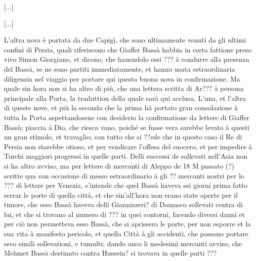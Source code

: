 \setcounter{docnumber}{15}



\setcounter{docnumber}{18}


[...]

\startcifrato

[...]

L'altra nova è  portata da due Capigì, che  sono ultimamente venuti da
gli  ultimi confini  di Persia,  quali riferiscono  che  Giaffer Bassà
habbia in  certa fattione preso  vivo Simon Giorgiano, et  dicono, che
hauendolo  essi ??? à  condurre alla  presenza del  Bassà, se  ne sono
partiti immediatamente,  et hanno usata  estraordinaria diligenzia nel
viaggio per portare  qui questa buona nova in  confirmazione. Ma quale
sin hora non  si ha altro di  più, che una lettera scritta  di Ar??? à
persona  principale alla  Porta, la  traduttion della  quale  sarà qui
acclusa. L'una,  et l'altra di queste  nove, et più la  seconda che la
prima hà portato gran consolazione à tutta la Porta aspettandosene con
desiderio la confirmatione da lettere di Giaffer Bassà; piaccia à Dio,
che riesca vano, poiché se fusse  vera sarebbe levato à questi un gran
stimolo, et travaglio; con tutto che si ??ede che in questo caso il Re
di Persia non starebbe otioso,  et per vendicare l'offesa del suocero,
et per  impedire à  Turchi maggiori progressi  in quelle  parti. Delli
successi de sollevati nell'Asia non si ha altro avviso, ma per lettere
di mercanti di Aleppo de 18 M passato (?) scritte qua con occasione di
messo estraordinario  à gli ?? mercanti  nostri per lo  ??? di lettere
per Venezia,  s'intende che quel  Bassà haveva sei giorni  prima fatto
serrar le porte  di quella città, et che  sin'all'hora non erano state
aperte  per il  timore, che  esso Bassà  haveva delli  Giannizzeri? di
Damasco sollevati contra di lui, et che si trovano al numero di ??? in
quei contorni,  facendo diversi danni  et per ciò non  permetteva esso
Bassà, che  si aprissero le  porte, per non  esporre et la sua  vita à
manifesto  pericolo, et  quella  Città à  gli  accidenti, che  possono
portare seco  simili sollevationi, e  tumulti; dando anco  li medesimi
mercanti avviso, che Mehmet Bassà destinato contra Hussein? si trovava
in quelle parti ???

